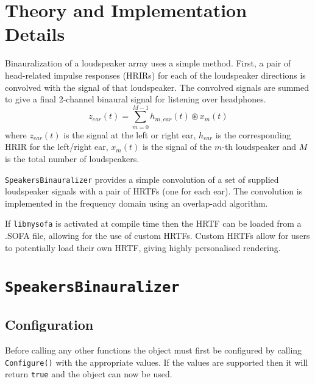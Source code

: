 \documentclass[12pt]{report}
\newcommand{\code}[1]{\texttt{#1}}
\begin{document}
\section{Theory and Implementation Details}
Binauralization of a loudspeaker array uses a simple method.
First, a pair of head-related impulse responses (HRIRs) for each of the loudspeaker directions is convolved with the signal of that loudspeaker.
The convolved signals are summed to give a final 2-channel binaural signal for listening over headphones.
\begin{equation}
    z_{ear}(t) = \sum_{m = 0}^{M - 1} h_{m,ear}(t)\circledast x_{m}(t)
\end{equation}
where $z_{ear}(t)$ is the signal at the left or right ear, $h_{ear}$ is the corresponding HRIR for the left/right ear, $x_{m}(t)$ is the signal of the $m$-th loudspeaker and $M$ is the total number of loudspeakers.

\code{SpeakersBinauralizer} provides a simple convolution of a set of supplied loudspeaker signals with a pair of HRTFs (one for each ear).
The convolution is implemented in the frequency domain using an overlap-add algorithm.

If \code{libmysofa} is activated at compile time then the HRTF can be loaded from a .SOFA file, allowing for the use of custom HRTFs.
Custom HRTFs allow for users to potentially load their own HRTF, giving highly personalised rendering.

\section{\code{SpeakersBinauralizer}}

\subsection{Configuration}

Before calling any other functions the object must first be configured by calling \code{Configure()} with the appropriate values. If the values are supported then it will return \code{true} and the object can now be used.
\end{document}
